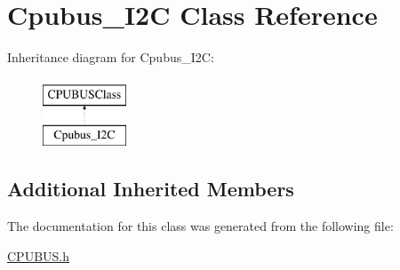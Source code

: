 \hypertarget{classCpubus__I2C}{\section{Cpubus\-\_\-\-I2\-C Class Reference}
\label{classCpubus__I2C}
}
Inheritance diagram for Cpubus\-\_\-\-I2\-C\-:\begin{figure}[H]
\begin{center}
\leavevmode
\includegraphics[height=2.000000cm]{classCpubus__I2C}
\end{center}
\end{figure}
\subsection*{Additional Inherited Members}


The documentation for this class was generated from the following file\-:\begin{DoxyCompactItemize}
\item 
\hyperlink{CPUBUS_8h}{C\-P\-U\-B\-U\-S.\-h}\end{DoxyCompactItemize}
